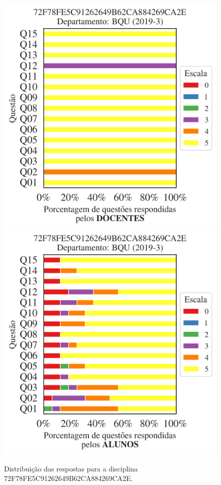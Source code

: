 \documentclass[a4paper,10pt]{article}
\begin{document}
\begin{figure}[h]
\centering
\includegraphics[width=0.485\linewidth]{analise_disciplina_departamento_BQU_72F78FE5C91262649B62CA884269CA2E_docentes.png}
\includegraphics[width=0.485\linewidth]{analise_disciplina_departamento_BQU_72F78FE5C91262649B62CA884269CA2E_alunos.png}
\caption{\label{fig:analise_geral_departamento}                Distribuição das respostas para a disciplina 72F78FE5C91262649B62CA884269CA2E. }
\end{figure}
\end{document}
